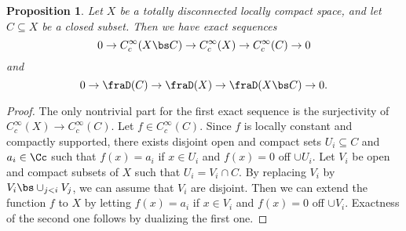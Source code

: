 \documentclass{article}
\newtheorem{proposition}{Proposition}[section]
\begin{document}
\begin{proposition}
Let $X$ be a totally disconnected locally compact space, and let $C\subseteq X$ be a closed subset. Then we have exact sequences
$$
0 \to C_{c}^{\infty}(X\bs C) \to C_{c}^{\infty}(X) \to C_{c}^{\infty}(C) \to 0
$$
and 
$$
0 \to \fraD(C) \to \fraD(X) \to \fraD(X\bs C) \to 0. 
$$
\end{proposition}
\begin{proof}
The only nontrivial part for the first exact sequence is the surjectivity of $C_{c}^{\infty}(X) \to C_{c}^{\infty}(C)$. Let $f\in C_{c}^{\infty}(C)$. Since $f$ is locally constant and compactly supported, there exists disjoint open and compact sets $U_{i} \subseteq C$ and $a_{i}\in \Cc$ such that $f(x) = a_i$ if $x\in U_i$ and $f(x) = 0$ off $\cup U_i$. 
Let $V_i$ be open and compact subsets of $X$ such that $U_i = V_i \cap C$. By replacing $V_i$ by $V_i \bs \cup_{j<i} V_j$, we can assume that $V_i$ are disjoint. Then we can extend the function $f$ to $X$ by letting $f(x) = a_i$ if $x\in V_i$ and $f(x) = 0$ off $\cup V_i$. 
Exactness of the second one follows by dualizing the first one. 
\end{proof}
\end{document}
